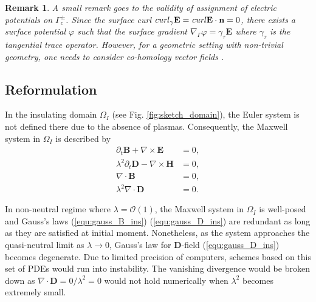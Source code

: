 \documentclass{article}
\newtheorem*{remark}{Remark}
\begin{document}
\vspace{10pt}

\begin{remark}
    A small remark goes to the validity of assignment of electric potentials on $\Gamma_c^\pm$. Since the surface curl $\text{\emph{curl}}_\gamma\mathbf{E} = \text{\emph{curl}} \mathbf{E} \cdot \mathbf{n} = 0$, there exists a surface potential $\varphi$ such that the surface gradient $\nabla_\Gamma \varphi = \gamma_\tau \mathbf{E}$ where $\gamma_\tau $ is the tangential trace operator. However, for a geometric setting with non-trivial geometry, one needs to consider co-homology vector fields \cite{Hiptmair_2021}.
\end{remark}



\subsection{Reformulation} \label{sec:reform_continuous}
In the insulating domain $\Omega_I$ (see Fig. \ref{fig:sketch_domain}), the Euler system is not defined there due to the absence of plasmas. Consequently, the Maxwell system in $\Omega_I$ is described by
\begin{subequations}
\begin{align}
    \partial_t \mathbf{B} + \nabla \times \mathbf{E} &= 0, \label{equ:faraday_ins}\\ 
    \lambda^2 \partial_t \mathbf{D} - \nabla \times \mathbf{H} &= 0,  \label{equ:ampere_ins}\\
    \nabla \cdot \mathbf{B} &= 0, \label{equ:gauss_B_ins}\\
    \lambda^2 \nabla \cdot \mathbf{D} &= 0 \label{equ:gauss_D_ins}.
\end{align}
\end{subequations}

In non-neutral regime where $\lambda = \mathcal{O}(1)$, the Maxwell system in $\Omega_I$ is well-posed and Gauss's laws (\ref{equ:gauss_B_ins}) (\ref{equ:gauss_D_ins}) are redundant as long as they are satisfied at initial moment. Nonetheless, as the system approaches the quasi-neutral limit as $\lambda \rightarrow 0$, Gauss's law for $\mathbf{D}$-field (\ref{equ:gauss_D_ins}) becomes degenerate. Due to limited precision of computers, schemes based on this set of PDEs would run into instability. The vanishing divergence would be broken down as $\nabla \cdot \mathbf{D} = 0/\lambda^2 = 0$ would not hold numerically when $\lambda^2$ becomes extremely small. 
\end{document}
